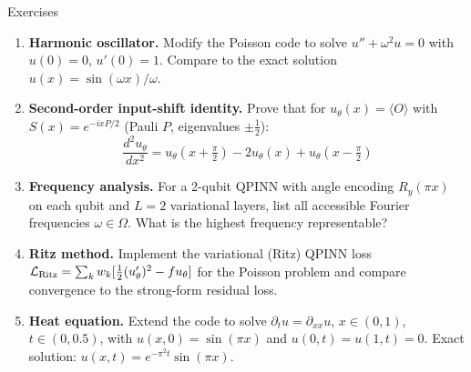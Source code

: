 \documentclass[aspectratio=169,10pt]{beamer}
\begin{document}
\begin{frame}{Exercises}
  \begin{enumerate}\itemsep5pt
    \item \textbf{Harmonic oscillator.}
          Modify the Poisson code to solve $u'' + \omega^2 u = 0$
          with $u(0)=0$, $u'(0)=1$.
          Compare to the exact solution $u(x) = \sin(\omega x)/\omega$.

    \item \textbf{Second-order input-shift identity.}
          Prove that for $u_\theta(x) = \langle O\rangle$ with
          $S(x) = e^{-ixP/2}$ (Pauli $P$, eigenvalues $\pm\tfrac12$):
          \[
            \frac{d^2 u_\theta}{dx^2}
            = u_\theta(x+\tfrac\pi2) - 2u_\theta(x) + u_\theta(x-\tfrac\pi2)
          \]

    \item \textbf{Frequency analysis.}
          For a 2-qubit QPINN with angle encoding $R_y(\pi x)$ on each
          qubit and $L=2$ variational layers, list all accessible
          Fourier frequencies $\omega\in\Omega$.
          What is the highest frequency representable?

    \item \textbf{Ritz method.}
          Implement the variational (Ritz) QPINN loss
          $\mathcal{L}_{\rm Ritz} = \sum_k w_k[\tfrac12(u'_\theta)^2 - fu_\theta]$
          for the Poisson problem and compare convergence to the
          strong-form residual loss.

    \item \textbf{Heat equation.}
          Extend the code to solve $\partial_t u = \partial_{xx} u$,
          $x\in(0,1)$, $t\in(0,0.5)$, with $u(x,0)=\sin(\pi x)$
          and $u(0,t)=u(1,t)=0$.
          Exact solution: $u(x,t) = e^{-\pi^2 t}\sin(\pi x)$.
  \end{enumerate}
\end{frame}
\end{document}

